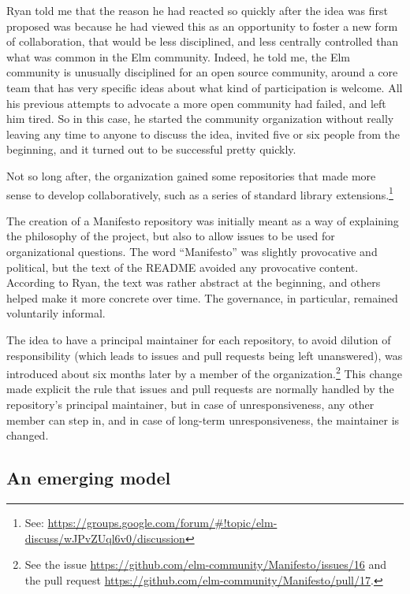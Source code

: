 Ryan told me that the reason he had reacted so quickly after the idea was first proposed was because he had viewed this as an opportunity to foster a new form of collaboration, that would be less disciplined, and less centrally controlled than what was common in the Elm community.
Indeed, he told me, the Elm community is unusually disciplined for an open source community, around a core team that has very specific ideas about what kind of participation is welcome.
All his previous attempts to advocate a more open community had failed, and left him tired.
So in this case, he started the community organization without really leaving any time to anyone to discuss the idea, invited five or six people from the beginning, and it turned out to be successful pretty quickly.

Not so long after, the organization gained some repositories that made more sense to develop collaboratively, such as a series of standard library extensions.\footnote{
	See: \url{https://groups.google.com/forum/\#!topic/elm-discuss/wJPvZUql6v0/discussion}
}

The creation of a Manifesto repository was initially meant as a way of explaining the philosophy of the project, but also to allow issues to be used for organizational questions.
The word ``Manifesto'' was slightly provocative and political, but the text of the README avoided any provocative content.
According to Ryan, the text was rather abstract at the beginning, and others helped make it more concrete over time.
The governance, in particular, remained voluntarily informal.

The idea to have a principal maintainer for each repository, to avoid dilution of responsibility (which leads to issues and pull requests being left unanswered), was introduced about six months later by a member of the organization.\footnote{
	See the issue \url{https://github.com/elm-community/Manifesto/issues/16} and the pull request \url{https://github.com/elm-community/Manifesto/pull/17}.
}
This change made explicit the rule that issues and pull requests are normally handled by the repository's principal maintainer, but in case of unresponsiveness, any other member can step in, and in case of long-term unresponsiveness, the maintainer is changed.

\subsection{An emerging model}

\label{sec:community-emerging}

